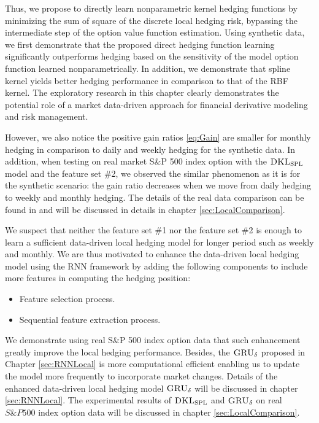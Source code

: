 \documentclass[letterpaper,12pt,titlepage,oneside,final]{book}
\numberwithin{equation}{section}
\theoremstyle{definition}
\newcommand{\model}{\textsc{GRU}_\delta}
\newcommand{\DKLs}{\bf\textsc{DKL}_{\text{SPL}}}
\begin{document}
Thus, we propose to directly learn nonparametric kernel hedging functions by minimizing the sum of square of the discrete local hedging risk, bypassing the intermediate step of the option value function estimation. Using synthetic data, we first demonstrate that the proposed direct hedging function learning significantly outperforms hedging based on the sensitivity of the model option function learned nonparametrically. In addition, we demonstrate that spline kernel yields better hedging performance in comparison to that of the RBF kernel. The exploratory research in this chapter clearly demonstrates the potential role of a market data-driven approach for financial derivative modeling and risk management. 

However, we also notice the positive gain ratios \eqref{eq:Gain} are  smaller for monthly hedging in comparison to daily and weekly hedging for the synthetic data. 
In addition, when testing on real market S\&P 500 index option with the $\DKLs$ model and the  feature set \#2, we observed the similar phenomenon as it is for the synthetic scenario: the gain ratio decreases when we move from daily hedging to weekly and monthly hedging. The details of the real data comparison can be found in \cite{knian2017} and will be discussed in details in chapter \ref{sec:LocalComparison}.

We suspect that neither the  feature set \#1 nor the  feature set \#2 is enough to learn a sufficient data-driven local hedging model for longer period such as weekly  and monthly.  We are thus motivated to enhance the data-driven local hedging model using  the RNN framework by adding the following components to include more features in computing the hedging position:
\begin{itemize}
\item  Feature selection process.
\item  Sequential feature extraction process.
\end{itemize}
We demonstrate using real S\&P 500 index option data that such enhancement greatly improve the local hedging performance.
Besides, the $\model$ proposed in Chapter \ref{sec:RNNLocal} is more computational efficient enabling  us to update the model more frequently to incorporate market changes.
Details of the enhanced data-driven local hedging model $\model$ will be discussed in chapter \ref{sec:RNNLocal}. The experimental results of $\DKLs$ and $\model$ on real $S\&P 500$ index option data will be discussed in chapter \ref{sec:LocalComparison}.
\end{document}
